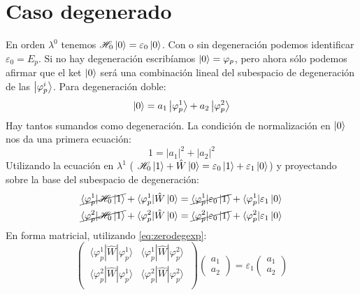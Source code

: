 \section{Caso degenerado}
En orden $\lambda^0$ tenemos $ \mathscr{H} _0 \ket{0} = \varepsilon_0
\ket{0}$. Con o sin degeneración podemos identificar $\varepsilon_0 =
E_p$. Si no hay degeneración escribíamos $\ket{0} = \varphi_p$, pero
ahora sólo podemos afirmar que el ket $\ket{0}$ será una combinación
lineal del subespacio de degeneración de las $\ket{\varphi_p^i}$. Para
degeneración doble:
\begin{equation}
\ket{0} = a_1 \ket{\varphi_p^1} + a_2 \ket{\varphi_p^2} 
\label{eq:zerodegexp}
\end{equation}
Hay tantos sumandos como degeneración. La condición de normalización
en $\ket{0}$ nos da una primera ecuación:
\begin{equation}
  1 = |a_1|^2 + |a_2|^2
  \label{eq:zeronorm}
\end{equation}
Utilizando la ecuación en $\lambda^1$ ( $ \mathscr{H} _0 \ket{1} + \hat{W} \ket{0} = \varepsilon_0 \ket{1} +
  \varepsilon_1 \ket{0}$) y proyectando sobre la base del subespacio de degeneración:
\begin{equation}
  \begin{split}
  \cancel{\langle \varphi_p^1 | \mathscr{H} _0 \ket{1}} +\langle \varphi_p^1| \hat{W}
  \ket{0} &= \cancel{\langle \varphi_p^1| \varepsilon_0 \ket{1}} +
   \langle \varphi_p^1 |\varepsilon_1 \ket{0} \\
  \cancel{\langle \varphi_p^2 | \mathscr{H} _0 \ket{1}} +\langle \varphi_p^2| \hat{W}
  \ket{0} &= \cancel{\langle \varphi_p^2| \varepsilon_0 \ket{1}} +
   \langle \varphi_p^2 |\varepsilon_1 \ket{0}
  \end{split}
\end{equation}
En forma matricial, utilizando \eqref{eq:zerodegexp}:
\begin{equation}
  \begin{pmatrix}
    \ \langle \varphi_p^1 | \hat{W} | \varphi_p^1 \rangle &  \langle \varphi_p^1 | \hat{W}
    | \varphi_p^2 \rangle\  \\ 
    \ \langle \varphi_p^2 | \hat{W} | \varphi_p^1 \rangle & \langle \varphi_p^2 | \hat{W}
    | \varphi_p^2 \rangle \ \\
  \end{pmatrix} 
  \begin{pmatrix}
    a_1 \\  a_2
  \end{pmatrix} = \varepsilon_1
  \begin{pmatrix}
    a_1 \\  a_2
  \end{pmatrix}
\end{equation}
